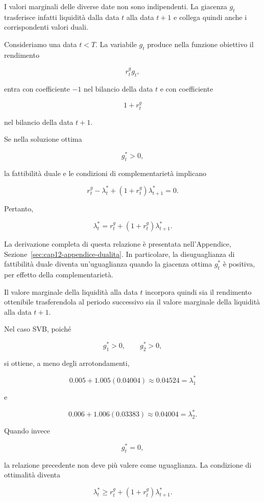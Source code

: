 I valori marginali delle diverse date non sono indipendenti. La giacenza
$g_t$ trasferisce infatti liquidit\`{a} dalla data $t$ alla data $t+1$ e
collega quindi anche i corrispondenti valori duali.

Consideriamo una data $t<T$. La variabile $g_t$ produce nella funzione
obiettivo il rendimento

\[
r_t^{g}g_t,
\]

\noindent entra con coefficiente $-1$ nel bilancio della data $t$ e con coefficiente

\[
1+r_t^{g}
\]

\noindent nel bilancio della data $t+1$.

Se nella soluzione ottima

\[
g_t^*>0,
\]

la fattibilit\`{a} duale e le condizioni di
complementariet\`{a} implicano

\[
r_t^{g}
-\lambda_t^*
+
(1+r_t^{g})\lambda_{t+1}^*
=
0.
\]

Pertanto,

\[
\boxed{
\lambda_t^*
=
r_t^{g}
+
(1+r_t^{g})\lambda_{t+1}^*.
}
\]

La derivazione completa di questa relazione
\`{e} presentata nell'Appendice,
Sezione~\ref{sec:cap12-appendice-dualita}.
In particolare, la disuguaglianza di fattibilit\`{a}
duale diventa un'uguaglianza quando
la giacenza ottima $g_t^*$ \`{e} positiva,
per effetto della complementariet\`{a}.


Il valore marginale della liquidit\`{a} alla data $t$ incorpora quindi sia il
rendimento ottenibile trasferendola al periodo successivo sia il valore
marginale della liquidit\`{a} alla data $t+1$.

Nel caso SVB, poich\'{e}

\[
g_1^*>0,
\qquad
g_2^*>0,
\]

\noindent si ottiene, a meno degli arrotondamenti,

\[
0.005+1.005(0.04004)
\approx
0.04524
=
\lambda_1^*
\]

\noindent e

\[
0.006+1.006(0.03383)
\approx
0.04004
=
\lambda_2^*.
\]

Quando invece

\[
g_t^*=0,
\]

\noindent la relazione precedente non deve pi\`{u} valere come uguaglianza. La
condizione di ottimalit\`{a} diventa

\[
\lambda_t^*
\geq
r_t^{g}
+
(1+r_t^{g})\lambda_{t+1}^*.
\]

